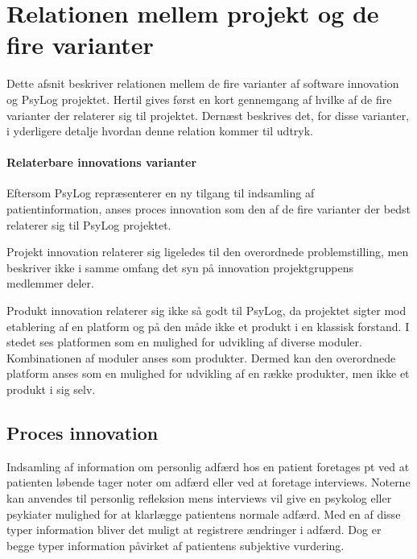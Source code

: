 \section{Relationen mellem projekt og de fire varianter}
Dette afsnit beskriver relationen mellem de fire varianter af software innovation\cite[Afsnit 5.1, Side 30-32]{art:essence} og PsyLog projektet.
Hertil gives først en kort gennemgang af hvilke af de fire varianter der relaterer sig til projektet.
Dernæst beskrives det, for disse varianter, i yderligere detalje hvordan denne relation kommer til udtryk.

\paragraph{Relaterbare innovations varianter}
Eftersom PsyLog repræsenterer en ny tilgang til indsamling af patientinformation, anses proces innovation som den af de fire varianter der bedst relaterer sig til PsyLog projektet.

Projekt innovation relaterer sig ligeledes til den overordnede problemstilling, men beskriver ikke i samme omfang det syn på innovation projektgruppens medlemmer deler.

Produkt innovation relaterer sig ikke så godt til PsyLog, da projektet sigter mod etablering af en platform og på den måde ikke et produkt i en klassisk forstand.
I stedet ses platformen som en mulighed for udvikling af diverse moduler.
Kombinationen af moduler anses som produkter.
Dermed kan den overordnede platform anses som en mulighed for udvikling af en række produkter, men ikke et produkt i sig selv.


\subsection{Proces innovation}
Indsamling af information om personlig adfærd hos en patient foretages pt ved at patienten løbende tager noter om adfærd eller ved at foretage interviews.
Noterne kan anvendes til personlig refleksion mens interviews vil give en psykolog eller psykiater mulighed for at klarlægge patientens normale adfærd.
Med en af disse typer information bliver det muligt at registrere ændringer i adfærd.
Dog er begge typer information påvirket af patientens subjektive vurdering.


